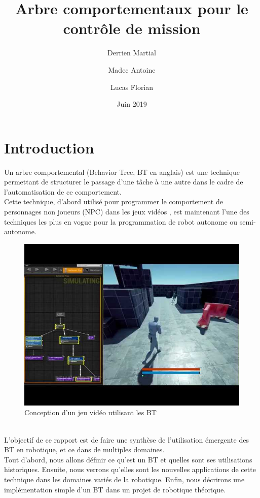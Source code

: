 \documentclass[titlepage]{article}
\title{Arbre comportementaux pour le contr\^ole de mission}
\author{
	Derrien Martial \\
	\and
	Madec Antoine \\
	\and
	Lucas Florian
}
\date{Juin 2019}
\begin{document}
	\maketitle
	\tableofcontents
	\hypersetup{linktocpage}
	
	\clearpage
	\section{Introduction}
	Un arbre comportemental (Behavior Tree, BT en anglais) est une
	technique permettant de structurer le passage d'une tâche à une autre dans 
	le cadre de l'automatisation de ce comportement.
	\\
	Cette technique, d'abord utilisé pour programmer le comportement de personnages non joueurs (NPC) dans les jeux vidéos \cite{wikipedia_BT}, est maintenant l'une des techniques les plus en vogue pour la programmation de robot autonome ou semi-autonome\cite{ros.org}.
	\\
	\begin{figure}[h!]
		\includegraphics[width=\linewidth]{img/videogame_tree.jpg}
		\caption{Conception d'un jeu vidéo utilisant les BT}
		\label{fig:BT2}
	\end{figure}
	\\
	L'objectif de ce rapport est de faire une synthèse de l'utilisation émergente des BT en robotique, et ce dans de multiples domaines.
	\\
	Tout d'abord, nous allons définir ce qu'est un BT et quelles sont ses utilisations historiques. Ensuite, nous verrons qu'elles sont les nouvelles applications de cette technique dans les domaines variés de la robotique. Enfin, nous décrirons une implémentation simple d'un BT dans un projet de robotique théorique.
	
\end{document}
